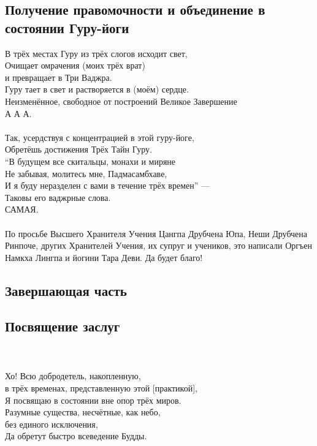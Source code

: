 \subsection*{Получение правомочности и объединение в состоянии Гуру-йоги}
В трёх местах Гуру из трёх слогов исходит свет,\\
Очищает омрачения (моих трёх врат) \\ \indent и превращает в Три Ваджра.\\
Гуру тает в свет и растворяется в (моём) сердце.\\
Неизменённое, свободное от построений Великое Завершение\\
\indent А А А.\\
\\
\scriptsize
Так, усердствуя с концентрацией в этой гуру-йоге,\\
Обретёшь достижения Трёх Тайн Гуру.\\
“В будущем все скитальцы, монахи и миряне\\
Не забывая, молитесь мне, Падмасамбхаве,\\
И я буду неразделен с вами в течение трёх времен” —\\
Таковы его ваджрные слова.\\
САМАЯ.\\
\\
По просьбе Высшего Хранителя Учения Цангпа Друбчена Юпа,
Неши Друбчена Ринпоче, других Хранителей Учения, их супруг и учеников,
это написали Оргъен Намкха Лингпа и йогини Тара Деви. Да будет благо!
\normalsize

\subsection{Завершающая часть}

\subsection*{Посвящение заслуг}\\
\\
Хо! Всю добродетель, накопленную, \\
\indent в трёх временах, представленную этой [практикой],\\
Я посвящаю в состоянии вне опор трёх миров.\\
Разумные существа, несчётные, как небо, \\
\indent без единого исключения,\\
Да обретут быстро всеведение Будды.

